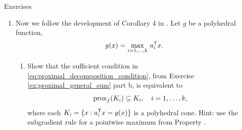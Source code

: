 \begin{xcb}{Exercises}
\begin{enumerate}[label=\thechapter.\arabic*]
\begin{enumerate}[label=\alph*.]
\item First show that, for any $x$, the point $\prox_f(\prox_g(x))$ satisfies  
  \[
  0 \in \prox_f(\prox_g(x)) - x + \partial g(\prox_g(x)) + 
  \partial f \big( \prox_f(\prox_g(x)) \big).
  \]
  Hint: use the proximal subgradient characterization
  \eqref{eq:proximal_subgradient_characterization} for $\prox_f(\prox_g(x))$, 
  as well as for $\prox_g(x)$, and add these two expressions together. 

\item Assume that 
  \begin{equation}
  \label{eq:proximal_decomposition_condition}
  \partial g(x) \subseteq \partial g(\prox_f(x)), \quad \text{for all $x$}. 
  \end{equation}
  Show that, for any $x$, the point $\prox_f(\prox_g(x))$ must then satisfy   
  \[
  0 \in \prox_f(\prox_g(x)) - x + \partial g \big( \prox_f(\prox_g(x)) \big) +  
  \partial f \big( \prox_f(\prox_g(x)) \big).
  \]
  Hint: use part a. Conclude using the subgradient characterization for
  $\prox_{f+g}(x)$ and single-valuedness of the proximal map that
  $\prox_{f+g}(x) = \prox_f(\prox_g(x))$, and as $x$ was arbitrary,
  $\prox_{f+g} =  \prox_f \circ \prox_g$.   

\item Let , with each $g_i$ closed and convex, 
  and . Prove that
  \eqref{eq:proximal_decomposition_condition} is implied by
  \begin{equation}
  \partial g_i(x) \subseteq \partial g_i(\prox_f(x)), \quad \text{for all $x$, 
    and $i=1,\dots,k$},  
  \end{equation}
  and thus the latter is a sufficient condition for $\prox_{f+g} =  \prox_f \circ
  \prox_g$. 
\end{enumerate}

\item \label{ex:generalized_tv_proximal_mapping}
  Now we follow the development of Corollary 4 in \cite{yu2013decomposing}. Let
  $g$ be a polyhedral function, 
  \[
  g(x) = \max_{i=1,\dots,k} \, a_i^{\mathsf{T}} x.
  \]
  
\begin{enumerate}[label=\alph*.]
\item Show that the sufficient condition in
  \eqref{eq:proximal_decomposition_condition}, from Exercise
  \ref{ex:proximal_general_sum} part b, is equivalent to  
  \[
  \operatorname{prox}_f(K_i) \subseteq K_i, \quad i=1,\dots,k,
  \]
  where each $K_i = \{x : a_i^{\mathsf{T}} x = g(x)\}$ is a polyhedral cone. Hint: use the
  subgradient rule for a pointwise maximum from Property
  .   


\end{enumerate}
\end{enumerate}
\end{xcb}
